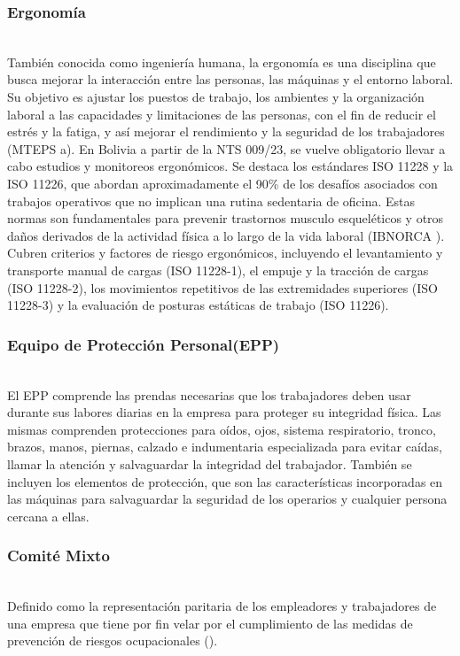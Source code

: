 \subsubsection{Ergonomía}\hfill\\
\indent
También conocida como ingeniería humana, la ergonomía es una disciplina que busca mejorar la interacción entre las personas, las máquinas y el entorno laboral. Su objetivo es ajustar los puestos de trabajo, los ambientes y la organización laboral a las capacidades y limitaciones de las personas, con el fin de reducir el estrés y la fatiga, y así mejorar el rendimiento y la seguridad de los trabajadores (MTEPS \citeyear{NTS-015/23}a). En Bolivia a partir de la NTS 009/23, se vuelve obligatorio llevar a cabo estudios y monitoreos ergonómicos. Se destaca los estándares ISO 11228 y la ISO 11226, que abordan aproximadamente el 90\% de los desafíos asociados con trabajos operativos que no implican una rutina sedentaria de oficina. Estas normas son fundamentales para prevenir trastornos musculo esqueléticos y otros daños derivados de la actividad física a lo largo de la vida laboral (IBNORCA \citeyear{IBNORCAnormasErgonomia}). Cubren criterios y factores de riesgo ergonómicos, incluyendo el levantamiento y transporte manual de cargas (ISO 11228-1), el empuje y la tracción de cargas (ISO 11228-2), los movimientos repetitivos de las extremidades superiores (ISO 11228-3) y la evaluación de posturas estáticas de trabajo (ISO 11226). 

\subsubsection{Equipo de Protección Personal(EPP)}\hfill\\
\indent
El EPP comprende las prendas necesarias que los trabajadores deben usar durante sus labores diarias en la empresa para proteger su integridad física. Las mismas comprenden protecciones para oídos, ojos, sistema respiratorio, tronco, brazos, manos, piernas, calzado e indumentaria especializada para evitar caídas, llamar la atención y salvaguardar la integridad del trabajador. También se incluyen los elementos de protección, que son las características incorporadas en las máquinas para salvaguardar la seguridad de los operarios y cualquier persona cercana a ellas.

\subsubsection{Comité Mixto}\hfill\\
\indent
Definido como la representación paritaria de los empleadores y trabajadores de una empresa que tiene por fin velar por el cumplimiento de las medidas de prevención  de riesgos ocupacionales (\cite{MTEPS2022}).

